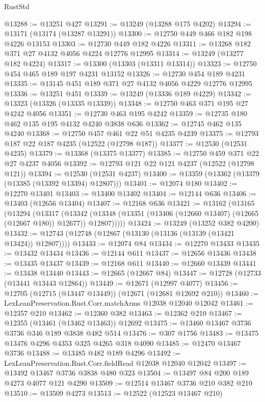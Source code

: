 \begin{lexlean}{RustStd}
\begin{coremodule}
@13288 := @13251 @427
@13291 := @13249 (@13288 @175 @4202)
@13294 := @13171 (@13174 (@13287 @13291))
@13300 := @12750 @449 @466 @182 @198 @4226 @13153
@13303 := @12730 @449 @182 @4226
@13311 := @13268 @182 @371 @27 @4132 @4056 @4224 @12776 @12995
@13314 := @13249 (@13277 @182 @4224)
@13317 := @13300 (@13303 (@13311 @13314))
@13323 := @12750 @454 @465 @189 @197 @4231 @13152
@13326 := @12730 @454 @189 @4231
@13335 := @13145 @451 @189 @371 @27 @4132 @4056 @4229 @12776 @12995
@13336 := @13251 @451
@13339 := @13249 (@13336 @189 @4229)
@13342 := @13323 (@13326 (@13335 @13339))
@13348 := @12750 @463 @371 @195 @27 @4242 @4056
@13351 := @12730 @463 @195 @4242
@13359 := @12735 @180 @462 @135 @195 @4132 @4240 @3838 @636
@13362 := @12745 @462 @135 @4240
@13368 := @12750 @457 @461 @22 @51 @4235 @4239
@13375 := @12793 @187 @22 @187 @4235 (@12522 (@12798 @187))
@13377 := @12530 (@12531 @4235)
@13379 := @13368 (@13375 @13377)
@13385 := @12750 @459 @371 @22 @27 @4237 @4056
@13392 := @12793 @121 @22 @121 @4237 (@12522 (@12798 @121))
@13394 := @12530 (@12531 @4237)
@13400 := @13359 (@13362 (@13379 (@13385 (@13392 @13394) @12807)))
@13401 := @12074 @180
@13402 := @12270 @13401
@13403 := @13400 @13402
@13404 := @12144 @636
@13406 := @13403 (@12656 @13404)
@13407 := @12168 @636
@13421 := @13162
    (@13165
      (@13294
        (@13317
          (@13342
            (@13348 (@13351 (@13406 (@12660 @13407) (@12665 (@12667 @180)) @12677)) @12807)))))
@13424 := @13249 (@13252 @382 @4200)
@13432 := @12743 (@12748 (@12867 (@13130 (@13136 (@13139 (@13421 @13424)) @12807))))
@13433 := @12074 @84
@13434 := @12270 @13433
@13435 := @13432 @13434
@13436 := @12144 @611
@13437 := @12656 @13436
@13438 := @13435 @13437
@13439 := @12168 @611
@13440 := @12660 @13439
@13441 := @13438 @13440
@13443 := @12665 (@12667 @84)
@13447 := @12728 (@12733 (@13441 @13443 @12864))
@13449 := @12671 (@12997 @4077)
@13456 := @12705 (@12715 (@13447 @13449)) (@12671 (@12681 @12692 @210))
@13460 := LexLeanPreservation.Rust.Corr.matchArms @12038 @12040 @12042
@13461 := @12357 @210
@13462 := @12360 @382
@13463 := @12362 @210
@13467 := @12355 (@13461 (@13462 @13463)) @12692
@13475 := @13460 @13467 @3736 @3736 @346 @189 @3838 @482 @514
@13476 := @307 @1756
@13483 := @13475 @13476 @4296 @4353 @325 @4265 @318 @4090
@13485 := @12470 @13467 @3736
@13488 := @13485 @482 @189 @4296
@13492 := LexLeanPreservation.Rust.Corr.fieldRead @12038 @12040 @12042
@13497 := @13492 @13467 @3736 @3838 @480 @323
@13504 := @13497 @84 @200 @189 @4273 @4077 @121 @4290
@13509 := @12514 @13467 @3736 @210 @382 @210
@13510 := @13509 @4273
@13513 := @12522 (@12523 @13467 @210)

\end{coremodule}
\end{lexlean}
